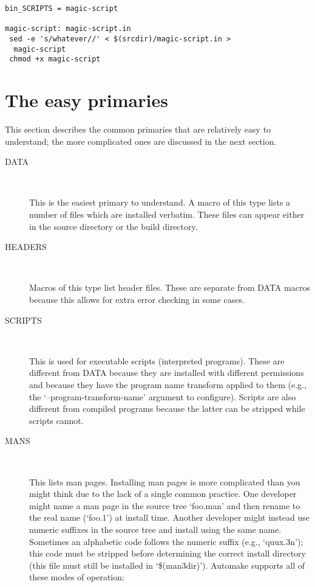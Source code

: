 \begin{Verbatim}[frame=single]
bin_SCRIPTS = magic-script

magic-script: magic-script.in
 sed -e 's/whatever//' < $(srcdir)/magic-script.in > 
  magic-script
 chmod +x magic-script
\end{Verbatim}

\section{The easy primaries}


This section describes the common primaries that are relatively easy to understand; the more complicated ones are discussed in the next section. 

\begin{description}
\item [DATA]
\ %

This is the easiest primary to understand. A macro of this type lists a number of files which are installed verbatim. These files can appear either in the source directory or the build directory. 

\item [HEADERS]
\ %

Macros of this type list header files. These are separate from DATA macros because this allows for extra error checking in some cases. 

\item [SCRIPTS]
\ %

This is used for executable scripts (interpreted programs). These are different from DATA because they are installed with different permissions and because they have the program name transform applied to them (e.g., the `--program-transform-name' argument to configure). Scripts are also different from compiled programs because the latter can be stripped while scripts cannot. 

\item [MANS]
\ %

This lists man pages. Installing man pages is more complicated than you might 
think due to the lack of a single common practice. One developer might 
name a man page in the source tree `foo.man' and then rename to the real 
name (`foo.1') at install time. Another developer might instead use numeric 
suffixes in the source tree and install using the same name. Sometimes an 
alphabetic code follows the numeric suffix (e.g., `quux.3n'); this code 
must be stripped before determining the correct install directory (this file 
must still be installed in `\$(man3dir)'). Automake supports all of these 
modes of operation:


\end{description}

